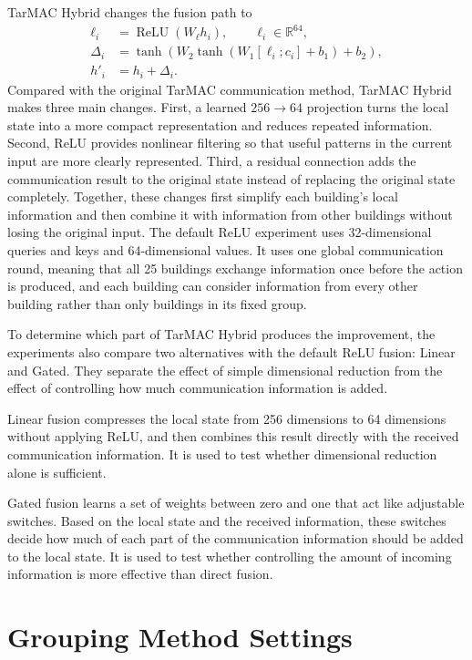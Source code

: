 TarMAC Hybrid changes the fusion path to
\begin{align}
\ell_i &= \operatorname{ReLU}(W_{\ell}h_i), \qquad
\ell_i\in\mathbb{R}^{64},\\
\Delta_i &= \tanh\!\left(W_2\tanh\left(W_1[\ell_i;c_i]
+b_1\right)+b_2\right),\\
h'_i &= h_i + \Delta_i.
\end{align}
Compared with the original TarMAC communication method, TarMAC Hybrid makes
three main changes. First, a learned $256\to64$ projection
turns the local state into a more compact representation and reduces repeated
information. Second, ReLU provides nonlinear filtering so that useful patterns
in the current input are more clearly represented. Third, a residual connection
adds the communication result to the original state instead of replacing the
original state completely. Together, these changes first simplify each
building's local information and then combine it with information from other
buildings without losing the original input. The default ReLU experiment uses
32-dimensional queries and keys and 64-dimensional values. It uses one global
communication round, meaning that all 25 buildings exchange information once
before the action is produced, and each building can consider information from
every other building rather than only buildings in its fixed group.

To determine which part of TarMAC Hybrid produces the improvement, the
experiments also compare two alternatives with the default ReLU fusion: Linear
and Gated. They separate the effect of simple dimensional reduction from the
effect of controlling how much communication information is added.

Linear fusion compresses the local state from 256 dimensions to 64 dimensions
without applying ReLU, and then combines this result directly with the received
communication information. It is used to test whether dimensional reduction
alone is sufficient.

Gated fusion learns a set of weights between zero and one that act like
adjustable switches. Based on the local state and the received information,
these switches decide how much of each part of the communication information
should be added to the local state. It is used to test whether controlling the
amount of incoming information is more effective than direct fusion.


\section{Grouping Method Settings}

